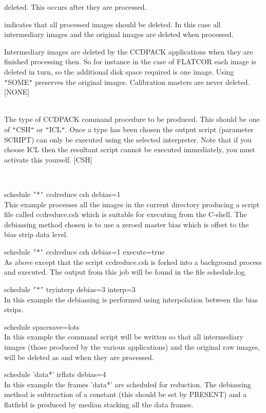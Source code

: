\documentclass[twoside,11pt]{article}
\newcommand{\htmlref}[2]{#1}
\renewcommand{\_}{\texttt{\symbol{95}}}
\newcommand{\qt}[1]{{\tt "}#1{\tt "}}
\newcommand{\qs}[1]{{\tt '}#1{\tt '}}
\newcommand{\xroutine}[1]{\htmlref{{\sc #1}}{#1}}
\newcommand{\sstexamples}[1]{
   \item[Examples:] \mbox{} \\
   \vspace{-3.5ex}
   \begin{description}
      #1
   \end{description}
}
\newcommand{\sstsubsection}[1]{ \item[{#1}] \mbox{} \\}
\newcommand{\sstexamplesubsection}[2]{\sloppy \item{\ssttt #1} \mbox{} \\ #2 }
\newcommand{\sstexamples}[1]{
      \item[Examples:] \\
      \begin{description}
         #1
      \end{description}
      \\
   }
\newcommand{\sstsubsection}[1]{\item[{#1}]}
\newcommand{\sstexamplesubsection}[2]{\item[{\ssttt #1}] #2}
\begin{document}
{{{\begin{description}
                   deleted. This occurs after they are processed.
            \item[\qt{LOTS}] indicates that all processed images should be deleted.
                   In this case all intermediary images and the original
                   images are deleted when processed.
         \end{description}
         Intermediary images are deleted by the CCDPACK applications when
         they are finished processing then. So for instance in the case
         of \xroutine{FLATCOR} each image is deleted in turn, so the additional disk
         space required is one image. Using \qt{SOME} preserves the original
         images. Calibration masters are never deleted.
         [NONE]
      }
      \sstsubsection{
         STYPE = LITERAL (Read)
      }{
         The type of CCDPACK command procedure to be produced. This
         should be one of \qt{CSH} or \qt{ICL}. Once a type has been
         chosen the output script (parameter SCRIPT) can only be
         executed using the selected interpreter. Note that if you
         choose ICL then the resultant script cannot be executed
         immediately, you must activate this yourself.
         [CSH]
      }
   }
   \sstexamples{
      \sstexamplesubsection{
         schedule \qs{$*$} ccdreduce csh debias=1
      }{
         This example processes all the images in the current directory
         producing a script file called ccdreduce.csh which is suitable
         for executing from the C-shell. The debiassing method chosen is
         to use a zeroed master bias which is offset to the bias strip
         data level.
      }
      \sstexamplesubsection{
         schedule \qs{$*$} ccdreduce csh debias=1 execute=true
      }{
         As above except that the script ccdreduce.csh is forked into a
         background process and executed. The output from this job will
         be found in the file schedule.log.
      }
      \sstexamplesubsection{
         schedule \qs{$*$} tryinterp debias=3 interp=3
      }{
         In this example the debiassing is performed using interpolation
         between the bias strips.
      }
      \sstexamplesubsection{
         schedule spacesave=lots
      }{
         In this example the command script will be written so that all
         intermediary images (those produced by the various applications)
         and the original raw images, will be deleted as and when they are
         processed.
      }
      \sstexamplesubsection{
         schedule 'data*' irflats debias=4
      } {
         In this example the frames 'data*' are scheduled for reduction.
         The debiassing method is subtraction of a constant (this should
         be set by \xroutine{PRESENT}) and a flatfield is produced by
         median stacking all the data frames.
      }
   }
}
\end{document}

